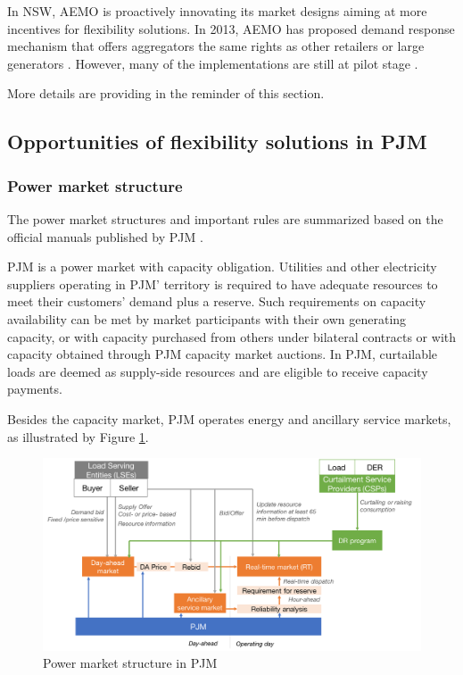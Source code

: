 In NSW, AEMO is proactively innovating its market designs aiming at more incentives for flexibility solutions. In 2013, AEMO has proposed demand response mechanism that offers aggregators the same rights as other retailers or large generators \cite{AEMO_DR_1}. However, many of the implementations are still at pilot stage \cite{AEMO_DR,AEMO_DR_Pilot}.

More details are providing in the reminder of this section.

\subsection{Opportunities of flexibility solutions in PJM}

\subsubsection{Power market structure}

The power market structures and important rules are summarized based on the official manuals published by PJM \cite{PJM2017b,PJM2017c,PJMInterconnection2017,PJM_web}.

PJM is a power market with capacity obligation. Utilities and other electricity suppliers operating in PJM' territory is required to have adequate resources to meet their customers' demand plus a reserve. Such requirements on capacity availability can be met by market participants with their own generating capacity, or with capacity purchased from others under bilateral contracts or with capacity obtained through PJM capacity market auctions. In PJM, curtailable loads are deemed as supply-side resources and are eligible to receive capacity payments.

Besides the capacity market, PJM operates energy and ancillary service markets, as illustrated by Figure \ref{fig:pjm-market-structure}.

\begin{figure}[h!]
	\centering
	\includegraphics[width=0.95\linewidth]{Figures/PJM_market-structure}
	\caption{Power market structure in PJM}
	\label{fig:pjm-market-structure}
\end{figure}

